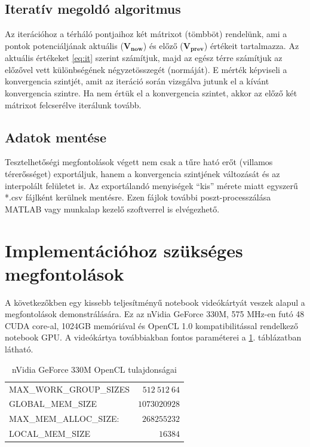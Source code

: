 \subsection{Iteratív megoldó algoritmus}
	Az iterációhoz a térháló pontjaihoz két mátrixot (tömbböt) rendelünk, ami a
	pontok potenciáljának aktuális ($\mathbf{V_{now}}$) és előző ($\mathbf{V_{prev}}$)
	értékeit tartalmazza.
	Az aktuális értékeket \eqref{eq:it} szerint számítjuk, majd az egész térre
	számítjuk az előzővel vett különbségének négyzetösszegét (normáját). E mérték
	képviseli a konvergencia szintjét, amit az iteráció során vizsgálva jutunk el a
	kívánt konvergencia szintre.
	Ha nem értük el a konvergencia szintet, akkor az előző két mátrixot
	felcserélve iterálunk tovább.
	
\subsection{Adatok mentése}
	Tesztelhetőségi megfontolások végett nem csak a tűre ható erőt (villamos
	térerősséget) exportáljuk, hanem a konvergencia szintjének változását és az
	interpolált felületet is. Az exportálandó menyiségek ``kis''
	mérete miatt egyszerű *.csv fájlként kerülnek mentésre. Ezen fájlok további
	poszt-processzálása MATLAB vagy munkalap kezelő szoftverrel is elvégezhető.

\section{Implementációhoz szükséges megfontolások}
	
	A következőkben egy kissebb teljesítményű notebook videókártyát veszek
	alapul a megfontolások demonstrálására. Ez az nVidia GeForce 330M, 
	575 MHz-en futó 48 CUDA core-al, 1024GB memóriával és
	OpenCL 1.0 kompatibilitással rendelkező notebook GPU.
	A videókártya továbbiakban fontos paraméterei a \ref{table:vcard}. táblázatban
	látható.
	
	\begin{table}[!h]
	\renewcommand{\arraystretch}{1.3}
	\caption{nVidia GeForce 330M OpenCL tulajdonságai}
	\label{table:vcard}
	\centering
	\begin{tabular}{l|r}
		MAX\_WORK\_GROUP\_SIZES & $512\ 512\ 64$\\
		GLOBAL\_MEM\_SIZE & $1073020928$\\
		MAX\_MEM\_ALLOC\_SIZE: & $268255232$\\
		LOCAL\_MEM\_SIZE & $16384$
	\end{tabular}
	\end{table}
	

